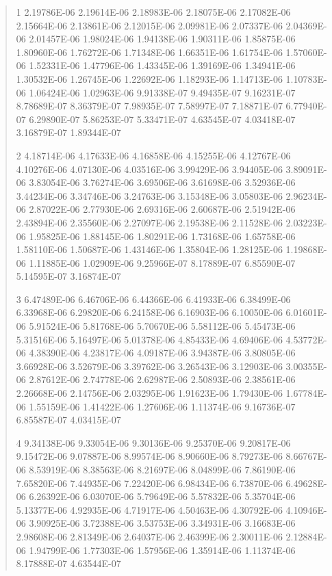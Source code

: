 \documentclass[letterpaper,10pt,english]{sphinxmanual}
\begin{document}
\begin{quote}
\begin{DUlineblock}{0em}
\item[]
\begin{DUlineblock}{\DUlineblockindent}
\item[] 1   2.19786E-06  2.19614E-06  2.18983E-06  2.18075E-06  2.17082E-06  2.15664E-06  2.13861E-06  2.12015E-06  2.09981E-06  2.07337E-06  2.04369E-06  2.01457E-06  1.98024E-06  1.94138E-06  1.90311E-06  1.85875E-06  1.80960E-06  1.76272E-06  1.71348E-06  1.66351E-06  1.61754E-06  1.57060E-06  1.52331E-06  1.47796E-06  1.43345E-06  1.39169E-06  1.34941E-06  1.30532E-06  1.26745E-06  1.22692E-06  1.18293E-06  1.14713E-06  1.10783E-06  1.06424E-06  1.02963E-06  9.91338E-07  9.49435E-07  9.16231E-07  8.78689E-07  8.36379E-07  7.98935E-07  7.58997E-07  7.18871E-07  6.77940E-07  6.29890E-07  5.86253E-07  5.33471E-07  4.63545E-07  4.03418E-07  3.16879E-07  1.89344E-07
\item[] 2   4.18714E-06  4.17633E-06  4.16858E-06  4.15255E-06  4.12767E-06  4.10276E-06  4.07130E-06  4.03516E-06  3.99429E-06  3.94405E-06  3.89091E-06  3.83054E-06  3.76274E-06  3.69506E-06  3.61698E-06  3.52936E-06  3.44234E-06  3.34746E-06  3.24763E-06  3.15348E-06  3.05803E-06  2.96234E-06  2.87022E-06  2.77930E-06  2.69316E-06  2.60687E-06  2.51942E-06  2.43894E-06  2.35560E-06  2.27097E-06  2.19538E-06  2.11528E-06  2.03223E-06  1.95825E-06  1.88145E-06  1.80291E-06  1.73168E-06  1.65758E-06  1.58110E-06  1.50687E-06  1.43146E-06  1.35804E-06  1.28125E-06  1.19868E-06  1.11885E-06  1.02909E-06  9.25966E-07  8.17889E-07  6.85590E-07  5.14595E-07  3.16874E-07
\item[] 3   6.47489E-06  6.46706E-06  6.44366E-06  6.41933E-06  6.38499E-06  6.33968E-06  6.29820E-06  6.24158E-06  6.16903E-06  6.10050E-06  6.01601E-06  5.91524E-06  5.81768E-06  5.70670E-06  5.58112E-06  5.45473E-06  5.31516E-06  5.16497E-06  5.01378E-06  4.85433E-06  4.69406E-06  4.53772E-06  4.38390E-06  4.23817E-06  4.09187E-06  3.94387E-06  3.80805E-06  3.66928E-06  3.52679E-06  3.39762E-06  3.26543E-06  3.12903E-06  3.00355E-06  2.87612E-06  2.74778E-06  2.62987E-06  2.50893E-06  2.38561E-06  2.26668E-06  2.14756E-06  2.03295E-06  1.91623E-06  1.79430E-06  1.67784E-06  1.55159E-06  1.41422E-06  1.27606E-06  1.11374E-06  9.16736E-07  6.85587E-07  4.03415E-07
\item[] 4   9.34138E-06  9.33054E-06  9.30136E-06  9.25370E-06  9.20817E-06  9.15472E-06  9.07887E-06  8.99574E-06  8.90660E-06  8.79273E-06  8.66767E-06  8.53919E-06  8.38563E-06  8.21697E-06  8.04899E-06  7.86190E-06  7.65820E-06  7.44935E-06  7.22420E-06  6.98434E-06  6.73870E-06  6.49628E-06  6.26392E-06  6.03070E-06  5.79649E-06  5.57832E-06  5.35704E-06  5.13377E-06  4.92935E-06  4.71917E-06  4.50463E-06  4.30792E-06  4.10946E-06  3.90925E-06  3.72388E-06  3.53753E-06  3.34931E-06  3.16683E-06  2.98608E-06  2.81349E-06  2.64037E-06  2.46399E-06  2.30011E-06  2.12884E-06  1.94799E-06  1.77303E-06  1.57956E-06  1.35914E-06  1.11374E-06  8.17888E-07  4.63544E-07

\end{DUlineblock}
\end{DUlineblock}
\end{quote}
\end{document}
